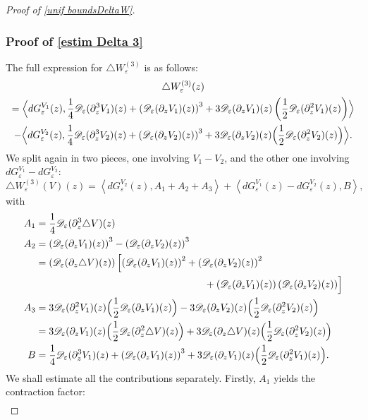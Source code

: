 \documentclass[JEP,XML,SOM,Unicode]{cedram}
\let\mathcal\mathscr
\theoremstyle{plain}
\theoremstyle{definition}
\newcommand{\D}{\mathcal{D}_\eps}
\let\eps\varepsilon
\newcommand{\dQVA}{dG_\eps^{V_1}}
\newcommand{\dQVB}{dG_\eps^{V_2}}
\begin{document}
\begin{proof}[Proof of \cref{unif boundsDeltaW}]
\subsubsection*{Proof of \eqref{estim Delta 3}}
The full expression for $\triangle W_\eps^{(3)}$ is as follows:
\begin{multline*}
\triangle W_\eps^{(3)}(z)\\ =
\Bigl\langle \dQVA(z), \dfrac{1}{4} \D(\partial_z^3 V_1)(z) + \left(\D(\partial_z V_1)(z)\right)^3 + 3\D(\partial_z V_1)(z) \left(\dfrac{1}{2} \D(\partial_z^2 V_1)(z)\right) \Bigr\rangle\\
-\Bigl\langle \dQVB(z), \dfrac{1}{4} \D(\partial_z^3 V_2)(z) + \left(\D(\partial_z V_2)(z)\right)^3 + 3 \D(\partial_z V_2)(z) \Bigl(\dfrac{1}{2} \D(\partial_z^2 V_2)(z) \Bigr) \Bigr\rangle.	
\end{multline*}
We split again in two pieces, one involving $V_1-V_2$, and the other one involving \hbox{$\dQVA-\dQVB$}:
\begin{equation*}
\triangle W_\eps^{(3)}(V)(z) = \left\langle \dQVB(z), A_1 + A_2 + A_3 \right\rangle + \left\langle \dQVA(z)-\dQVB(z),B \right\rangle,
\end{equation*}
with
\begin{align*}
A_1 &= \dfrac{1}{4} \D(\partial_z^3 \triangle V)(z) \\
A_2 & = \left(\D(\partial_z V_1)(z)\right)^3 - \left(\D(\partial_z V_2)(z)\right)^3 \\
& =
\left(\D(\partial_z \triangle V)(z)\right)
\Bigl[ \left(\D(\partial_z V_1)(z)\right)^2
+ \left(\D(\partial_z V_2)(z)\right)^2\\
&\hspace*{6cm} + \left(\D(\partial_z V_1)(z)\right)\left(\D(\partial_z V_2)(z)\right) \Bigr]\\
A_3 & = 
3 \D(\partial_z^2 V_1)(z) \Bigl( \dfrac{1}{2} \D(\partial_z V_1)(z) \Bigr) -  3 \D(\partial_z V_2)(z) \Bigl( \dfrac{1}{2} \D(\partial_z^2 V_2)(z) \Bigr)\\
& = 3 \D(\partial_z V_1)(z) \Bigl(\dfrac{1}{2} \D(\partial_z^2 \triangle V)(z) \Bigr) + 3 \D(\partial_z \triangle V)(z) \Bigl(\dfrac{1}{2} \D(\partial_z^2 V_2)(z) \Bigr)\\
B &= \dfrac{1}{4} \D(\partial_z^3 V_1)(z) + \left(\D(\partial_z V_1)(z)\right)^3
+ 3\D(\partial_z V_1)(z) \Bigl(\dfrac{1}{2} \D(\partial_z^2 V_1)(z) \Bigr).
\end{align*}
We shall estimate all the contributions separately. Firstly, $A_1$ yields the contraction factor:
\begin{align*}

\end{align*}
\end{proof}
\end{document}
